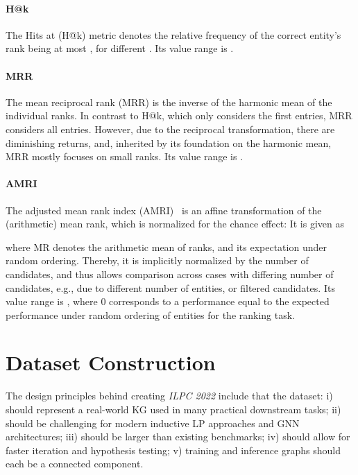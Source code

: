 \documentclass[sigconf,screen]{acmart}
\newcommand{\ilpc}{\textsl{\textsc{ILPC 2022}}\xspace}
\begin{document}
\paragraph{\textbf{H@k}}
The Hits at  (H@k) metric denotes the relative frequency of the correct entity's rank being at most , for different .
Its value range is .

\paragraph{\textbf{MRR}}
The mean reciprocal rank (MRR) is the inverse of the harmonic mean of the individual ranks.
In contrast to H@k, which only considers the first  entries, MRR considers all entries.
However, due to the reciprocal transformation, there are diminishing returns, and, inherited by its foundation on the harmonic mean, MRR mostly focuses on small ranks.
Its value range is .

\paragraph{\textbf{AMRI}}
The adjusted mean rank index (AMRI)~ \cite{Berrendorf2020} is an affine transformation of the (arithmetic) mean rank, which is normalized for the chance effect:
It is given as

where MR denotes the arithmetic mean of ranks, and  its expectation under random ordering.
Thereby, it is implicitly normalized by the number of candidates, and thus allows comparison across cases with differing number of candidates, e.g., due to different number of entities, or filtered candidates.
Its value range is , where 0 corresponds to a performance equal to the expected performance under random ordering of entities for the ranking task.


\section{Dataset Construction}
\label{sec:ds_construction}

The design principles behind creating \ilpc include that the dataset: i) should represent a real-world KG used in many practical downstream tasks; ii) should be challenging for modern inductive LP approaches and GNN architectures; iii) should be larger than existing benchmarks; iv) should allow for faster iteration and hypothesis testing; v) training and inference graphs should each be a connected component.
\end{document}
